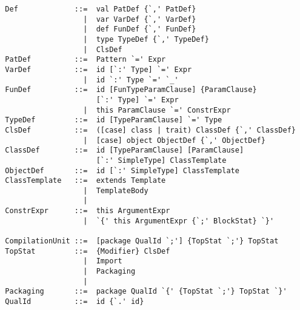 \documentclass[a4paper,12pt,twoside,titlepage]{book}
\begin{document}
\begin{lstlisting}
  Def             ::=  val PatDef {`,' PatDef}
                    |  var VarDef {`,' VarDef}
                    |  def FunDef {`,' FunDef}
                    |  type TypeDef {`,' TypeDef}
                    |  ClsDef
  PatDef          ::=  Pattern `=' Expr
  VarDef          ::=  id [`:' Type] `=' Expr
                    |  id `:' Type `=' `_'
  FunDef          ::=  id [FunTypeParamClause] {ParamClause} 
                       [`:' Type] `=' Expr
                    |  this ParamClause `=' ConstrExpr
  TypeDef         ::=  id [TypeParamClause] `=' Type
  ClsDef          ::=  ([case] class | trait) ClassDef {`,' ClassDef}
                    |  [case] object ObjectDef {`,' ObjectDef}
  ClassDef        ::=  id [TypeParamClause] [ParamClause] 
                       [`:' SimpleType] ClassTemplate
  ObjectDef       ::=  id [`:' SimpleType] ClassTemplate
  ClassTemplate   ::=  extends Template
                    |  TemplateBody
                    |
  ConstrExpr      ::=  this ArgumentExpr
                    |  `{' this ArgumentExpr {`;' BlockStat} `}'

  CompilationUnit ::=  [package QualId `;'] {TopStat `;'} TopStat
  TopStat         ::=  {Modifier} ClsDef
                    |  Import
                    |  Packaging
                    |
  Packaging       ::=  package QualId `{' {TopStat `;'} TopStat `}'
  QualId          ::=  id {`.' id}
\end{lstlisting}
\end{document}
